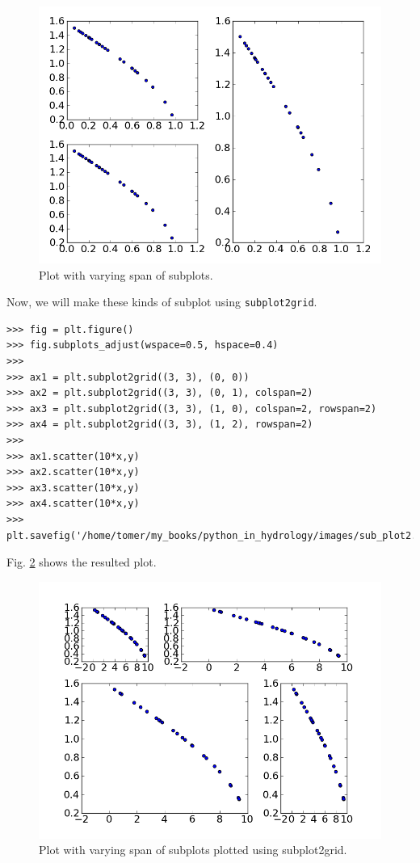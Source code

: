 \documentclass[10pt]{book}
\begin{document}
{\beforefig
\begin{figure}[h!]
  \centering
    \includegraphics[scale=0.5]{images/sub_plot1.png}
  \caption{Plot with varying span of subplots.}
   \label{fig:subplot1}
\end{figure}
\afterfig

Now, we will make these kinds of subplot using \verb"subplot2grid". 
\beforeverb \begin{verbatim}
>>> fig = plt.figure()
>>> fig.subplots_adjust(wspace=0.5, hspace=0.4)
>>> 
>>> ax1 = plt.subplot2grid((3, 3), (0, 0))
>>> ax2 = plt.subplot2grid((3, 3), (0, 1), colspan=2)
>>> ax3 = plt.subplot2grid((3, 3), (1, 0), colspan=2, rowspan=2)
>>> ax4 = plt.subplot2grid((3, 3), (1, 2), rowspan=2)
>>> 
>>> ax1.scatter(10*x,y)
>>> ax2.scatter(10*x,y)
>>> ax3.scatter(10*x,y)
>>> ax4.scatter(10*x,y)
>>> plt.savefig('/home/tomer/my_books/python_in_hydrology/images/sub_plot2.png')
\end{verbatim} \afterverb
Fig. \ref{fig:subplot2} shows the resulted plot.

\beforefig
\begin{figure}[h!]
  \centering
    \includegraphics[scale=0.5]{images/sub_plot2.png}
  \caption{Plot with varying span of subplots plotted using subplot2grid.}
   \label{fig:subplot2}
\end{figure}
\afterfig

}
\end{document}
